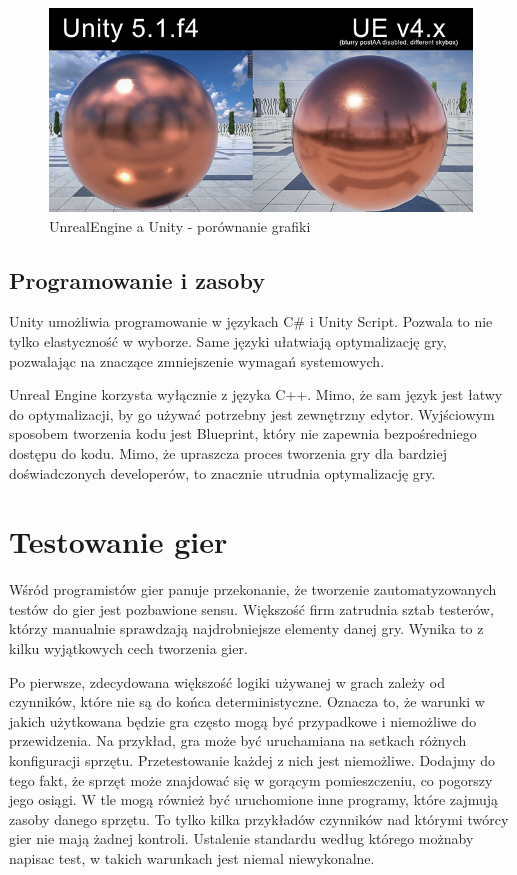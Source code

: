 \documentclass[12pt]{xmgr}
\begin{document}
\begin{figure}[!htb]
    \begin{center}
    \includegraphics[scale=0.5]{Screeny/UE_vs_Unity}
    \end{center}
    \caption{UnrealEngine a Unity - porównanie grafiki}
\end{figure}

\section{Programowanie i zasoby}

Unity umożliwia programowanie w językach C\# i Unity Script. Pozwala to nie tylko elastyczność w wyborze. Same języki ułatwiają optymalizację gry, pozwalając na znaczące zmniejszenie wymagań systemowych.

Unreal Engine korzysta wyłącznie z języka C++. Mimo, że sam język jest łatwy do optymalizacji, by go używać potrzebny jest zewnętrzny edytor. Wyjściowym sposobem tworzenia kodu jest Blueprint, który nie zapewnia bezpośredniego dostępu do kodu. Mimo, że upraszcza proces tworzenia gry dla bardziej doświadczonych developerów, to znacznie utrudnia optymalizację gry.

\chapter{ Testowanie gier}

Wśród programistów gier panuje przekonanie, że tworzenie zautomatyzowanych testów do gier jest pozbawione sensu. Większość firm zatrudnia sztab testerów, którzy manualnie sprawdzają najdrobniejsze elementy danej gry. Wynika to z kilku wyjątkowych cech tworzenia gier.

Po pierwsze, zdecydowana większość logiki używanej w grach zależy od czynników, które nie są do końca deterministyczne. Oznacza to, że warunki w jakich użytkowana będzie gra często mogą być przypadkowe i niemożliwe do przewidzenia. Na przykład, gra może być uruchamiana na setkach różnych konfiguracji sprzętu. Przetestowanie każdej z nich jest niemożliwe. Dodajmy do tego fakt, że sprzęt może znajdować się w gorącym pomieszczeniu, co pogorszy jego osiągi. W tle mogą również być uruchomione inne programy, które zajmują zasoby danego sprzętu. To tylko kilka przykładów czynników nad którymi twórcy gier nie mają żadnej kontroli. Ustalenie standardu według którego możnaby napisac test, w takich warunkach jest niemal niewykonalne.
\end{document}
